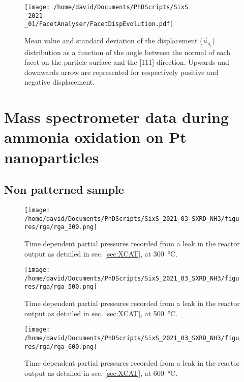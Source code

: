 \begin{figure}[!htb]
    \centering
    \texttt{[image: /home/david/Documents/PhDScripts/SixS\\\_2021\\\_01/FacetAnalyser/FacetDispEvolution.pdf]}
    \caption{
        Mean value and standard deviation of the displacement ($\vec{u}_{\hat{q_z}}$) distribution as a function of the angle between the normal of each facet on the particle surface and the [111] direction.
        Upwards and downwards arrow are represented for respectively positive and negative displacement.
    }
    \label{fig:AmaterasuDisplacement}
\end{figure}


\section{Mass spectrometer data during ammonia oxidation on Pt nanoparticles}

\subsection{Non patterned sample} \label{sec:RGANanoparticlesNonPatterned}

\begin{figure}[!htb]
    \centering
    \texttt{[image: /home/david/Documents/PhDScripts/SixS\_2021\_03\_SXRD\_NH3/figures/rga/rga\_300.png]}
    \caption{
        Time dependent partial pressures recorded from a leak in the reactor output as detailed in sec. \ref{sec:XCAT}, at \qty{300}{\degreeCelsius}.
    }
    \label{fig:RGA300SXRDNanoparticles}
\end{figure}

\begin{figure}[!htb]
    \centering
    \texttt{[image: /home/david/Documents/PhDScripts/SixS\_2021\_03\_SXRD\_NH3/figures/rga/rga\_500.png]}
    \caption{
        Time dependent partial pressures recorded from a leak in the reactor output as detailed in sec. \ref{sec:XCAT}, at \qty{500}{\degreeCelsius}.
    }
    \label{fig:RGA500SXRDNanoparticles}
\end{figure}

\begin{figure}[!htb]
    \centering
    \texttt{[image: /home/david/Documents/PhDScripts/SixS\_2021\_03\_SXRD\_NH3/figures/rga/rga\_600.png]}
    \caption{
        Time dependent partial pressures recorded from a leak in the reactor output as detailed in sec. \ref{sec:XCAT}, at \qty{600}{\degreeCelsius}.
    }
    \label{fig:RGA600SXRDNanoparticles}
\end{figure}

